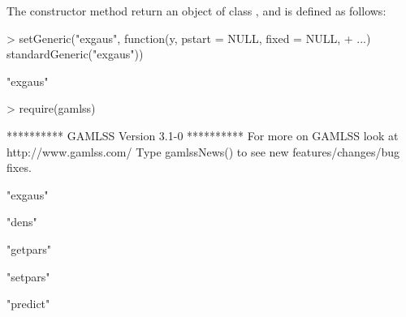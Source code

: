 \documentclass[article]{jss}
\begin{document}
The constructor method return an object of class , and is
defined as follows:
\begin{Schunk}
\begin{Sinput}
> setGeneric("exgaus", function(y, pstart = NULL, fixed = NULL, 
+     ...) standardGeneric("exgaus"))
\end{Sinput}
\begin{Soutput}
[1] "exgaus"
\end{Soutput}
\begin{Sinput}
> require(gamlss)
\end{Sinput}
\begin{Soutput}
 **********   GAMLSS Version 3.1-0 ********** 
For more on GAMLSS look at http://www.gamlss.com/ 
Type gamlssNews() to see new features/changes/bug fixes.
\end{Soutput}
\begin{Soutput}
[1] "exgaus"
\end{Soutput}
\end{Schunk}



\begin{Schunk}
\begin{Soutput}
[1] "dens"
\end{Soutput}
\begin{Soutput}
[1] "getpars"
\end{Soutput}
\begin{Soutput}
[1] "setpars"
\end{Soutput}
\begin{Soutput}
[1] "predict"
\end{Soutput}
\end{Schunk}
\end{document}
